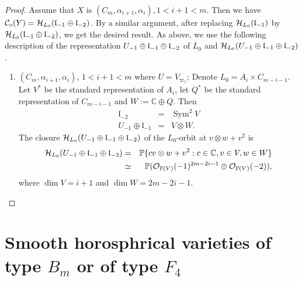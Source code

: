 \documentclass[12pt]{amsart}
\theoremstyle{plain}
\theoremstyle{definition}
\def\Sym{\operatorname{Sym}}
\begin{document}
\begin{proof}
\medskip
Assume that  $X$ is  $(C_m, \alpha_{i+1}, \alpha_{i}), 1 < i+1 < m$. Then we have
$\mathcal C_o(Y)=\mathcal H_{L_0}(\frak l_{-1} \oplus \frak l_{-2})$. By a similar argument, after replacing $\mathcal H_{L_0}(\frak l_{-1})$ by $\mathcal H_{L_0}(\frak l_{-1} \oplus \frak l_{-2})$, we get the desired result. As above, we use the following description of the representation $U_{-1} \oplus \frak l_{-1} \oplus \frak l_{-2}  $
of $L_0$ and $\mathcal H_{L_0}(U_{-1} \oplus \frak l_{-1} \oplus \frak l_{-2} )$.
\begin{enumerate}
\item[$ {\rm (3)_{i+1}}$] $(C_m, \alpha_{i+1}, \alpha_{i})$, $1 < i+1 < m$ where $U=V_{\varpi_1}$; Denote $L_0=A_{i}\times C_{m-i-1}$. Let $V^*$ be the standard representation of $A_{i}$, let $Q^*$ be the standard representation of $C_{m-i-1}$ and $W:= \mathbb C \oplus Q$. Then
\begin{eqnarray*}
\mathfrak l_{-2}&=& \Sym^2V \\
U_{-1} \oplus\mathfrak l_{-1} &=& V \otimes W.
\end{eqnarray*}
The closure $\mathcal H_{L_0}(U_{-1} \oplus \frak l_{-1} \oplus \frak l_{-2}  )$ of the  $L_0$-orbit at $v\otimes w + v^2 $ is %
\begin{eqnarray*}
\mathcal H_{L_0}(U_{-1} \oplus \frak l_{-1} \oplus \frak l_{-2} ) &=& \mathbb P \{c v \otimes w + v^2 : c \in \mathbb C, v \in V, w \in W \}\\
& \simeq &\mathbb P (\mathcal O_{\mathbb P(V)}(-1)^{2m-2i-1} \oplus \mathcal O_{\mathbb P(V)}(-2)),
\end{eqnarray*}
where $\dim V=i+1$ and $\dim W=2m-2i-1$.
\end{enumerate}
\end{proof}


\section{Smooth horosphrical varieties of type $B_m$ or of type $F_4$} \label{sect:horospherical BF type}
\end{document}
